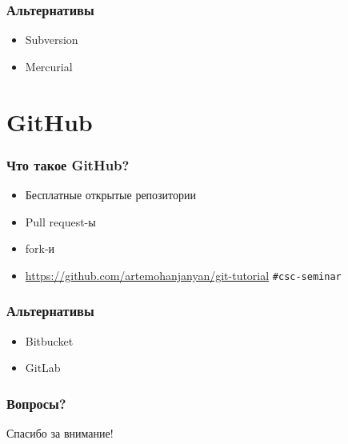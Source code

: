 \documentclass[pdf,russian]{beamer}
\begin{document}
\begin{frame}
    \frametitle{Альтернативы}
    \begin{itemize}
        \item Subversion
        \item Mercurial
    \end{itemize}
\end{frame}

\section{GitHub}

\begin{frame}
    \frametitle{Что такое GitHub?}
    \begin{itemize}
        \pause
        \item Бесплатные открытые репозитории
        \pause
        \item Pull request-ы
        \pause
        \item fork-и
        \pause
        \item \url{https://github.com/artemohanjanyan/git-tutorial}
            \pause\texttt{\#{}csc-seminar}
    \end{itemize}
\end{frame}

\begin{frame}
    \frametitle{Альтернативы}
    \begin{itemize}
        \pause
        \item Bitbucket
        \pause
        \item GitLab
    \end{itemize}
\end{frame}

\begin{frame}
    \frametitle{Вопросы?}
    \pause
    Спасибо за внимание!
\end{frame}
\end{document}
